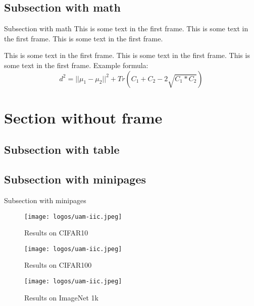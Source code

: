 \renewcommand{\subsectiontitle}{Subsection with math}
\subsection{\subsectiontitle}

\begin{frame}{\subsectiontitle}
    This is some text in the first frame. This is some text in the first frame. This is some text in the first frame.
    \begin{itemize}
    \itemj This is some text in the first frame. This is some text in the first frame. This is some text in the first frame.
    \itemj Example formula: $$d^2 = ||\mu_1 - \mu_2||^2 + Tr(C_1 + C_2 - 2\sqrt{C_1*C_2})$$ 
    \end{itemize}
\end{frame}

\renewcommand{\sectiontitle}{Section without frame}
\section{\sectiontitle}

\renewcommand{\subsectiontitle}{Subsection with table}
\subsection{\subsectiontitle}


\renewcommand{\subsectiontitle}{Subsection with minipages}
\subsection{\subsectiontitle}

\begin{frame}{\subsectiontitle}
    \begin{figure}[ht]
        \begin{minipage}[b]{0.45\linewidth}
            \centering
            \texttt{[image: logos/uam-iic.jpeg]}
            \caption{Results on CIFAR10}
            \label{fig:cifar10}
        \end{minipage}
        \hspace{0.5cm}
        \begin{minipage}[b]{0.45\linewidth}
            \centering
            \texttt{[image: logos/uam-iic.jpeg]}
            \caption{Results on CIFAR100}
            \label{fig:cifar100}
        \end{minipage}
        \begin{minipage}[b]{0.45\linewidth}
            \centering
            \texttt{[image: logos/uam-iic.jpeg]}
            \caption{Results on ImageNet 1k}
            \label{fig:imagenet1k}
        \end{minipage}
    \end{figure}
\end{frame}